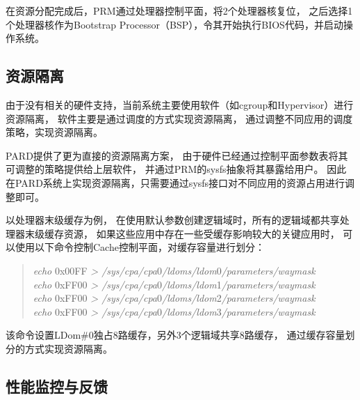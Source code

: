 在资源分配完成后，PRM通过处理器控制平面，将2个处理器核复位，
之后选择1个处理器核作为Bootstrap Processor（BSP），令其开始执行BIOS代码，并启动操作系统。

%


\subsection{资源隔离}

由于没有相关的硬件支持，当前系统主要使用软件（如cgroup和Hypervisor）进行资源隔离，
软件主要是通过调度的方式实现资源隔离，
通过调整不同应用的调度策略，实现资源隔离。

PARD提供了更为直接的资源隔离方案，
由于硬件已经通过控制平面参数表将其可调整的策略提供给上层软件，
并通过PRM的sysfs抽象将其暴露给用户。
因此在PARD系统上实现资源隔离，只需要通过sysfs接口对不同应用的资源占用进行调整即可。

以处理器末级缓存为例，
在使用默认参数创建逻辑域时，所有的逻辑域都共享处理器末级缓存资源，
如果这些应用中存在一些受缓存影响较大的关键应用时，
可以使用以下命令控制Cache控制平面，对缓存容量进行划分：

\begin{verse}
\textit{echo} 0x00FF \textit{>  /sys/cpa/cpa}0\textit{/ldoms/ldom}0\textit{/parameters/waymask} \\
\textit{echo} 0xFF00 \textit{>  /sys/cpa/cpa}0\textit{/ldoms/ldom}1\textit{/parameters/waymask} \\
\textit{echo} 0xFF00 \textit{>  /sys/cpa/cpa}0\textit{/ldoms/ldom}2\textit{/parameters/waymask} \\
\textit{echo} 0xFF00 \textit{>  /sys/cpa/cpa}0\textit{/ldoms/ldom}3\textit{/parameters/waymask} \\
\end{verse}

该命令设置LDom\#0独占8路缓存，另外3个逻辑域共享8路缓存，
通过缓存容量划分的方式实现资源隔离。


\subsection{性能监控与反馈}

